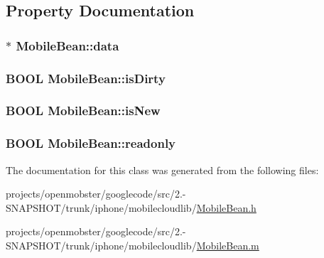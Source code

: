 \subsection{\-Property \-Documentation}
\hypertarget{interface_mobile_bean_afbb725368f73fc95c7896c466e6ab913}{
\subsubsection[{data}]{ $\ast$ \-Mobile\-Bean\-::data}}
\label{interface_mobile_bean_afbb725368f73fc95c7896c466e6ab913}
\hypertarget{interface_mobile_bean_a13520d7327987f517659625a25290036}{
\subsubsection[{is\-Dirty}]{\setlength{\rightskip}{0pt plus 5cm}\-B\-O\-O\-L \-Mobile\-Bean\-::is\-Dirty}}
\label{interface_mobile_bean_a13520d7327987f517659625a25290036}
\hypertarget{interface_mobile_bean_adfb5677488f58845e4873d8b1edfe15d}{
\subsubsection[{is\-New}]{\setlength{\rightskip}{0pt plus 5cm}\-B\-O\-O\-L \-Mobile\-Bean\-::is\-New}}
\label{interface_mobile_bean_adfb5677488f58845e4873d8b1edfe15d}
\hypertarget{interface_mobile_bean_a9d7d56a7ab0d2e868ebd251fd1582861}{
\subsubsection[{readonly}]{\setlength{\rightskip}{0pt plus 5cm}\-B\-O\-O\-L \-Mobile\-Bean\-::readonly}}
\label{interface_mobile_bean_a9d7d56a7ab0d2e868ebd251fd1582861}


\-The documentation for this class was generated from the following files\-:\begin{DoxyCompactItemize}
\item 
projects/openmobster/googlecode/src/2.-\/\-S\-N\-A\-P\-S\-H\-O\-T/trunk/iphone/mobilecloudlib/\hyperlink{_mobile_bean_8h}{\-Mobile\-Bean.\-h}\item 
projects/openmobster/googlecode/src/2.-\/\-S\-N\-A\-P\-S\-H\-O\-T/trunk/iphone/mobilecloudlib/\hyperlink{_mobile_bean_8m}{\-Mobile\-Bean.\-m}\end{DoxyCompactItemize}
